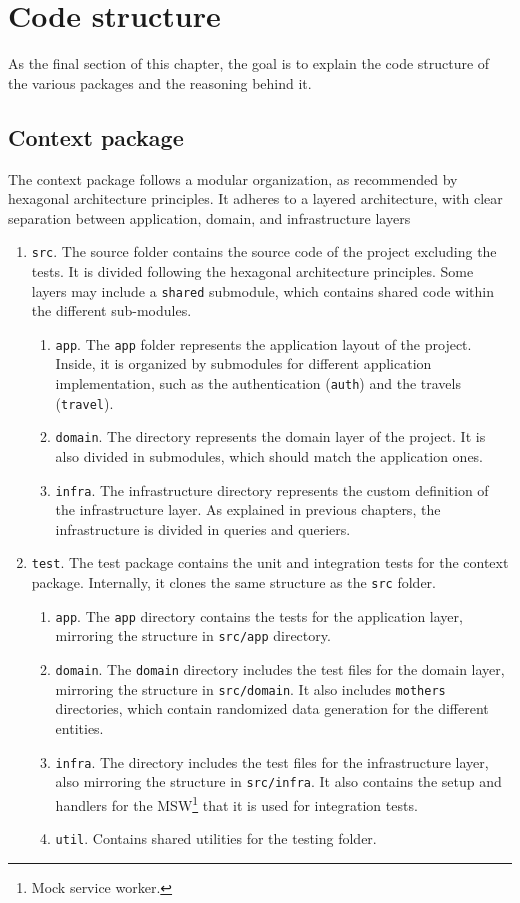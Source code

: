 \documentclass[./memory.tex]{subfiles}
\begin{document}
\section{Code structure}
As the final section of this chapter, the goal is to explain the code structure
of the various packages and the reasoning behind it.
\subsection{Context package}
The context package follows a modular organization, as recommended by hexagonal
architecture principles. It adheres to a layered architecture, with clear
separation between application, domain, and infrastructure layers
\begin{enumerate}[label = -]
	\item\texttt{src}. The source folder contains the source code of the project
	excluding the tests. It is divided following the hexagonal architecture
	principles. Some layers may include a \texttt{shared} submodule, which contains
	shared code within the different sub-modules.
	\begin{enumerate}[label = -]
		\item\texttt{app}. The \texttt{app} folder represents the application
		layout of the project. Inside, it is organized by submodules for
		different application implementation, such as the authentication
		(\texttt{auth}) and the travels (\texttt{travel}).
		\item\texttt{domain}. The directory represents the domain layer of the
		project. It is also divided in submodules, which should match the
		application ones.
		\item\texttt{infra}. The infrastructure directory represents the custom
		definition of the infrastructure layer. As explained in previous
		chapters, the infrastructure is divided in queries and queriers.
	\end{enumerate}
	\item\texttt{test}. The test package contains the unit and integration tests
	for the context package. Internally, it clones the same structure as the
	\texttt{src} folder.
	\begin{enumerate}[label = -]
		\item\texttt{app}. The \texttt{app} directory contains the tests for the
		application layer, mirroring the structure in \texttt{src/app}
		directory.
		\item\texttt{domain}. The \texttt{domain} directory includes the test
		files for the domain layer, mirroring the structure in
		\texttt{src/domain}. It also includes \texttt{mothers} directories,
		which contain randomized data generation for the different entities.
		\item\texttt{infra}. The directory includes the test files for the
		infrastructure layer, also mirroring the structure in
		\texttt{src/infra}. It also contains the setup and handlers for the
		MSW\footnote{Mock service worker.} that it is used for integration
		tests.
		\item\texttt{util}. Contains shared utilities for the testing folder.
	\end{enumerate}
\end{enumerate}
\end{document}

